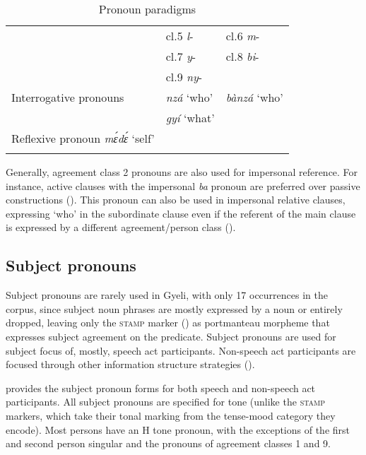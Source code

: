 \begin{table}
\begin{tabular}{lll}
 &  cl.5 {\itshape l}- & cl.6 {\itshape m}-  \\
 & cl.7 {\itshape y}- &  cl.8 {\itshape bi}- \\
 &  cl.9 {\itshape ny}- &  \\
\midrule 
Interrogative pronouns & {\itshape nzá} `who' & {\itshape bànzá} `who' \\
 & {\itshape gyí} `what'  & \\
\midrule
Reflexive pronoun {\itshape mɛ́dɛ́} `self' & & \\
 \lspbottomrule
\end{tabular}
\caption{Pronoun paradigms}
\label{Tab:Pros}
\end{table}

Generally, agreement class 2 pronouns are also used for impersonal reference. For instance, active clauses with the impersonal {\itshape ba} pronoun are preferred over passive constructions (). This pronoun can also be used in impersonal relative clauses, expressing `who' in the subordinate clause even if the referent of the main clause is expressed by a different agreement/person class ().




\subsection{Subject pronouns}
\label{sec:SBJPRO}

Subject pronouns are rarely used in Gyeli, with only 17 occurrences in the corpus, since subject noun phrases are mostly expressed by a noun or entirely dropped, leaving only the \textsc{stamp} marker () as portmanteau morpheme that expresses subject agreement on the predicate. Subject pronouns are used for subject focus of, mostly, speech act participants. Non-speech act participants are focused through other information structure strategies ().



 provides the subject pronoun forms for both speech and non-speech act participants. All subject pronouns are specified for tone (unlike the \textsc{stamp} markers, which take their tonal marking from the tense-mood category they encode). Most persons have an H tone pronoun, with the exceptions of the first and second person singular and the pronouns of agreement classes 1 and 9.

